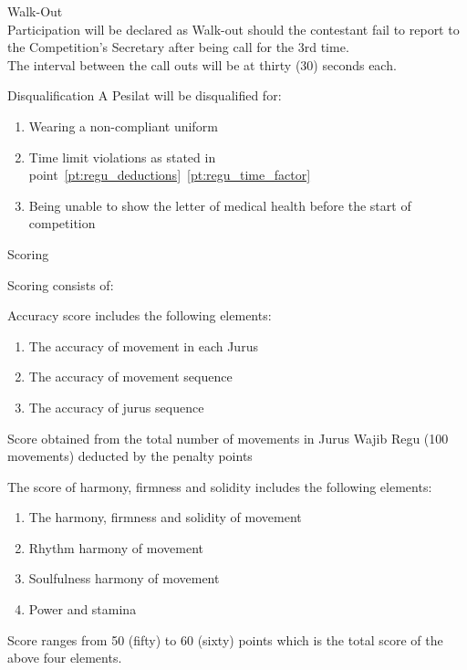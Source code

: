 \begin{legal}
\begin{legal}
\begin{legal}
        \item Walk-Out \\
            Participation will be declared as Walk-out should the contestant fail to report to the Competition’s 
            Secretary after being call for the 3rd time.\\

            The interval between the call outs will be at thirty (30) seconds each.

        \item Disqualification
            A Pesilat will be disqualified for:
            \begin{enumerate}[label=\alph*.]
            \item Wearing a non-compliant uniform 
            \item Time limit violations as stated in point~\ref{pt:regu_deductions}~\ref{pt:regu_time_factor}
            \item Being unable to show the letter of medical health before the start of competition
            \end{enumerate}
        \end{legal} %
    \end{legal} %

\item Scoring
    \begin{legal}
    \item Scoring consists of:
        \begin{legal}
        \item Accuracy score includes the following elements:
            \begin{enumerate}[label*=\alph*.]
            \item The accuracy of movement in each Jurus
            \item The accuracy of movement sequence
            \item The accuracy of jurus sequence
            \end{enumerate}
            Score obtained from the total number of movements in Jurus Wajib Regu (100 movements) deducted by the penalty points

        \item The score of harmony, firmness and solidity includes the following elements:
            \begin{enumerate}[label*=\alph*.]
            \item The harmony, firmness and solidity of movement
            \item Rhythm harmony of movement
            \item Soulfulness harmony of movement
            \item Power and stamina
            \end{enumerate}
        Score ranges from 50 (fifty) to 60 (sixty) points which is the total score of the above four elements.
        \end{legal} %
    \end{legal} %


\end{legal}
